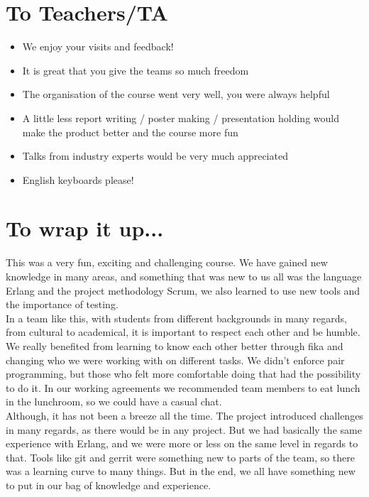 \documentclass[11pt,a4paper]{report}
\begin{document}
\section*{To Teachers/TA}
\begin{itemize}
\item We enjoy your visits and feedback!
\item It is great that you give the teams so much freedom
\item The organisation of the course went very well, you were always helpful
\item A little less report writing / poster making / presentation holding would
  make the product better and the course more fun
\item Talks from industry experts would be very much appreciated
\item English keyboards please!
\end{itemize}


\section*{To wrap it up...}
This was a very fun, exciting and challenging course. We have gained new
knowledge in many areas, and something that was new to us all was the
language Erlang and the project methodology Scrum, we also learned to
use new tools and the importance of testing.\\

In a team like this, with students from different backgrounds in many regards,
from cultural to academical, it is important to respect each other and be humble.
We really benefited from learning to know each other better through fika and
changing who we were working with on different tasks. We didn't enforce
pair programming, but those who felt more comfortable doing that had the
possibility to do it. In our working agreements we recommended team members to
eat lunch in the lunchroom, so we could have a casual chat.\\

Although, it has not been a breeze all the time. The project introduced
challenges in many regards, as there would be in any project.
But we had basically the same experience with Erlang, and we were more or less
on the same level in regards to that. Tools like git and gerrit were something
new to parts of the team, so there was a learning curve to many things. But in
the end, we all have something new to put in our bag of knowledge and experience.
\appendix
\end{document}
